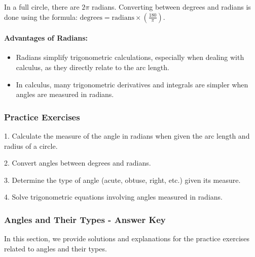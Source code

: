 \documentclass[a4paper,12pt]{book}
\begin{document}
In a full circle, there are $2\pi$ radians. Converting between degrees and radians is done using the formula: $\text{degrees} = \text{radians} \times \left(\frac{180}{\pi}\right)$.

\paragraph{Advantages of Radians:}

\begin{itemize}
    \item Radians simplify trigonometric calculations, especially when dealing with calculus, as they directly relate to the arc length.
    
    \item In calculus, many trigonometric derivatives and integrals are simpler when angles are measured in radians.
\end{itemize}

\subsubsection*{Practice Exercises}

1. Calculate the measure of the angle in radians when given the arc length and radius of a circle.

2. Convert angles between degrees and radians.

3. Determine the type of angle (acute, obtuse, right, etc.) given its measure.

4. Solve trigonometric equations involving angles measured in radians.

\subsubsection*{Angles and Their Types - Answer Key}
\label{subsec:angles_and_their_types_answers}

In this section, we provide solutions and explanations for the practice exercises related to angles and their types.
\end{document}
